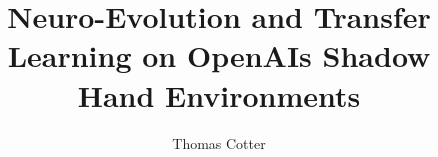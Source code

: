 \documentclass[a4paper,11pt,twoside]{report}
\begin{document}
\title{Neuro-Evolution and Transfer Learning on OpenAIs Shadow Hand Environments}

\author{Thomas Cotter}

\normallinespacing
\maketitle


\preface



\body









\end{document}

